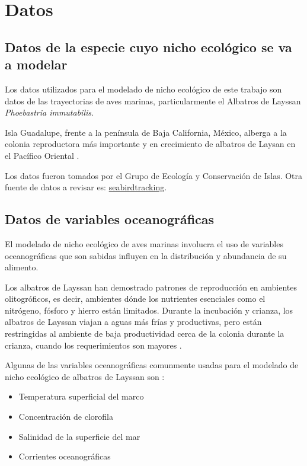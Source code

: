 \section*{Datos}

\subsection*{Datos de la especie cuyo nicho ecológico se va a modelar}

Los datos utilizados para el modelado de nicho ecológico de este trabajo son
datos de las trayectorias de aves marinas, particularmente el Albatros de
Layssan \textit{Phoebastria immutabilis}.

Isla Guadalupe, frente a la península de Baja California, México, alberga a la
colonia reproductora más importante y en crecimiento de albatros de Laysan en el
Pacífico Oriental \cite{hernandez2014laysan}.

Los datos fueron tomados por el Grupo de Ecología y Conservación de Islas.
Otra fuente de datos a revisar es: \href{https://data.seabirdtracking.org/dataset/1928}{seabirdtracking}.

\subsection*{Datos de variables oceanográficas}

El modelado de nicho ecológico de aves marinas involucra el uso de variables
oceanográficas que son sabidas influyen en la distribución y abundancia de su
alimento. 

Los albatros de Layssan han demostrado patrones de reproducción en ambientes
olitogróficos, es decir, ambientes dónde los nutrientes esenciales como el
nitrógeno, fósforo y hierro están limitados. Durante la incubación y crianza,
los albatros de Layssan viajan a aguas más frías y productivas, pero están
restringidas al ambiente de baja productividad cerca de la colonia durante la
crianza, cuando los requerimientos son mayores \cite{kappes2015reproductive}.

Algunas de las variables oceanográficas comunmente usadas para el modelado de
nicho ecológico de albatros de Layssan son \cite{henry2021successful}:

\begin{itemize}
    \item Temperatura superficial del marco
    \item Concentración de clorofila
    \item Salinidad de la superficie del mar
    \item Corrientes oceanográficas
\end{itemize}


